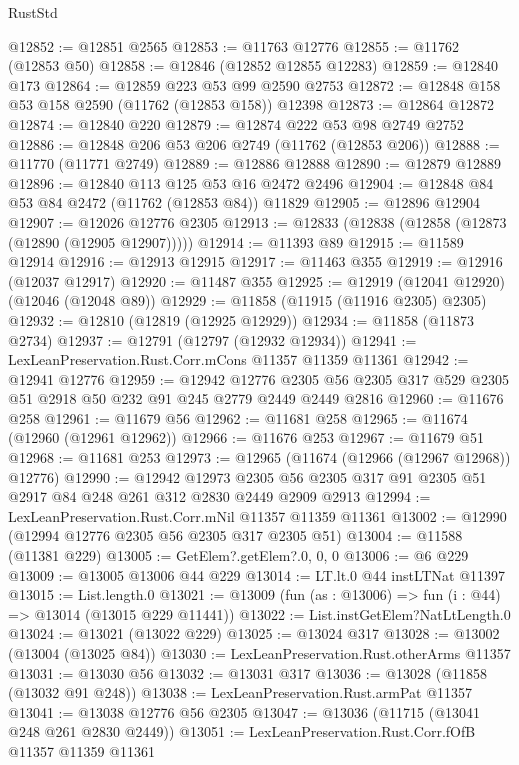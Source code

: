 \begin{lexlean}{RustStd}
\begin{coremodule}
@12852 := @12851 @2565
@12853 := @11763 @12776
@12855 := @11762 (@12853 @50)
@12858 := @12846 (@12852 @12855 @12283)
@12859 := @12840 @173
@12864 := @12859 @223 @53 @99 @2590 @2753
@12872 := @12848 @158 @53 @158 @2590 (@11762 (@12853 @158)) @12398
@12873 := @12864 @12872
@12874 := @12840 @220
@12879 := @12874 @222 @53 @98 @2749 @2752
@12886 := @12848 @206 @53 @206 @2749 (@11762 (@12853 @206))
@12888 := @11770 (@11771 @2749)
@12889 := @12886 @12888
@12890 := @12879 @12889
@12896 := @12840 @113 @125 @53 @16 @2472 @2496
@12904 := @12848 @84 @53 @84 @2472 (@11762 (@12853 @84)) @11829
@12905 := @12896 @12904
@12907 := @12026 @12776 @2305
@12913 := @12833 (@12838 (@12858 (@12873 (@12890 (@12905 @12907)))))
@12914 := @11393 @89
@12915 := @11589 @12914
@12916 := @12913 @12915
@12917 := @11463 @355
@12919 := @12916 (@12037 @12917)
@12920 := @11487 @355
@12925 := @12919 (@12041 @12920) (@12046 (@12048 @89))
@12929 := @11858 (@11915 (@11916 @2305) @2305)
@12932 := @12810 (@12819 (@12925 @12929))
@12934 := @11858 (@11873 @2734)
@12937 := @12791 (@12797 (@12932 @12934))
@12941 := LexLeanPreservation.Rust.Corr.mCons @11357 @11359 @11361
@12942 := @12941 @12776
@12959 := @12942
    @12776
    @2305
    @56
    @2305
    @317
    @529
    @2305
    @51
    @2918
    @50
    @232
    @91
    @245
    @2779
    @2449
    @2449
    @2816
@12960 := @11676 @258
@12961 := @11679 @56
@12962 := @11681 @258
@12965 := @11674 (@12960 (@12961 @12962))
@12966 := @11676 @253
@12967 := @11679 @51
@12968 := @11681 @253
@12973 := @12965 (@11674 (@12966 (@12967 @12968)) @12776)
@12990 := @12942
    @12973
    @2305
    @56
    @2305
    @317
    @91
    @2305
    @51
    @2917
    @84
    @248
    @261
    @312
    @2830
    @2449
    @2909
    @2913
@12994 := LexLeanPreservation.Rust.Corr.mNil @11357 @11359 @11361
@13002 := @12990 (@12994 @12776 @2305 @56 @2305 @317 @2305 @51)
@13004 := @11588 (@11381 @229)
@13005 := GetElem?.getElem?.{0, 0, 0}
@13006 := @6 @229
@13009 := @13005 @13006 @44 @229
@13014 := LT.lt.{0} @44 instLTNat @11397
@13015 := List.length.{0}
@13021 := @13009 (fun (as : @13006) => fun (i : @44) => @13014 (@13015 @229 @11441))
@13022 := List.instGetElem?NatLtLength.{0}
@13024 := @13021 (@13022 @229)
@13025 := @13024 @317
@13028 := @13002 (@13004 (@13025 @84))
@13030 := LexLeanPreservation.Rust.otherArms @11357
@13031 := @13030 @56
@13032 := @13031 @317
@13036 := @13028 (@11858 (@13032 @91 @248))
@13038 := LexLeanPreservation.Rust.armPat @11357
@13041 := @13038 @12776 @56 @2305
@13047 := @13036 (@11715 (@13041 @248 @261 @2830 @2449))
@13051 := LexLeanPreservation.Rust.Corr.fOfB @11357 @11359 @11361

\end{coremodule}
\end{lexlean}
